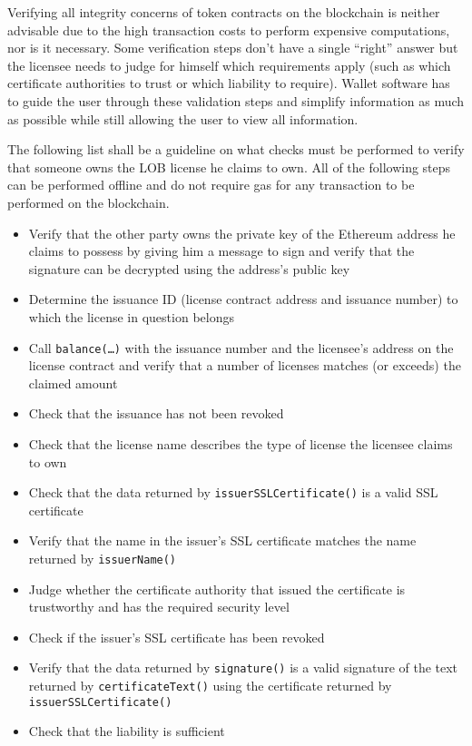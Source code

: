 \documentclass[a4paper]{article}
\begin{document}
Verifying all integrity concerns of token contracts on the blockchain is neither advisable due to the high transaction costs to perform expensive computations, nor is it necessary. Some verification steps don't have a single “right” answer but the licensee needs to judge for himself which requirements apply (such as which certificate authorities to trust or which liability to require). Wallet software has to guide the user through these validation steps and simplify information as much as possible while still allowing the user to view all information.

The following list shall be a guideline on what checks must be performed to verify that someone owns the LOB license he claims to own. All of the following steps can be performed offline and do not require gas for any transaction to be performed on the blockchain.

\begin{itemize}
  \item Verify that the other party owns the private key of the Ethereum address he claims to possess by giving him a message to sign and verify that the signature can be decrypted using the address's public key
  \item Determine the issuance ID (license contract address and issuance number) to which the license in question belongs
  \item Call \texttt{balance(…)} with the issuance number and the licensee's address on the license contract and verify that a number of licenses matches (or exceeds) the claimed amount
  \item Check that the issuance has not been revoked
  \item Check that the license name describes the type of license the licensee claims to own
  \item Check that the data returned by \texttt{issuerSSLCertificate()} is a valid SSL certificate
  \item Verify that the name in the issuer's SSL certificate matches the name returned by \texttt{issuerName()}
  \item Judge whether the certificate authority that issued the certificate is trustworthy and has the required security level
  \item Check if the issuer's SSL certificate has been revoked
  \item Verify that the data returned by \texttt{signature()} is a valid signature of the text returned by \texttt{certificateText()} using the certificate returned by \texttt{issuerSSLCertificate()}
  \item Check that the liability is sufficient
\end{itemize}
\end{document}
